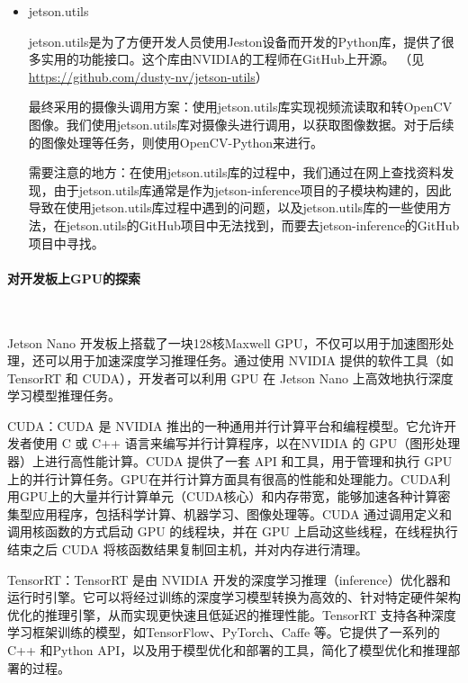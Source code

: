 \documentclass[UTF8]{article}
\begin{document}
\begin{itemize}
    \item jetson.utils
    
    jetson.utils是为了方便开发人员使用Jeston设备而开发的Python库，提供了很多实用的功能接口。这个库由NVIDIA的工程师在GitHub上开源。
    （见\url{https://github.com/dusty-nv/jetson-utils}）

    最终采用的摄像头调用方案：使用jetson.utils库实现视频流读取和转OpenCV图像。我们使用jetson.utils库对摄像头进行调用，以获取图像数据。对于后续的图像处理等任务，则使用OpenCV-Python来进行。

    需要注意的地方：在使用jetson.utils库的过程中，我们通过在网上查找资料发现，由于jetson.utils库通常是作为jetson-inference项目的子模块构建的，因此导致在使用jetson.utils库过程中遇到的问题，以及jetson.utils库的一些使用方法，在jetson.utils的GitHub项目中无法找到，而要去jetson-inference的GitHub项目中寻找。
    
\end{itemize}

\paragraph{对开发板上GPU的探索}~{}

Jetson Nano 开发板上搭载了一块128核Maxwell GPU，不仅可以用于加速图形处理，还可以用于加速深度学习推理任务。通过使用 NVIDIA 提供的软件工具（如 TensorRT 和 CUDA），开发者可以利用 GPU 在 Jetson Nano 上高效地执行深度学习模型推理任务。


CUDA：CUDA 是 NVIDIA 推出的一种通用并行计算平台和编程模型。它允许开发者使用 C 或 C++ 语言来编写并行计算程序，以在NVIDIA 的 GPU（图形处理器）上进行高性能计算。CUDA 提供了一套 API 和工具，用于管理和执行 GPU 上的并行计算任务。GPU在并行计算方面具有很高的性能和处理能力。CUDA利用GPU上的大量并行计算单元（CUDA核心）和内存带宽，能够加速各种计算密集型应用程序，包括科学计算、机器学习、图像处理等。CUDA 通过调用定义和调用核函数的方式启动 GPU 的线程块，并在 GPU 上启动这些线程，在线程执行结束之后 CUDA 将核函数结果复制回主机，并对内存进行清理。

TensorRT：TensorRT 是由 NVIDIA 开发的深度学习推理（inference）优化器和运行时引擎。它可以将经过训练的深度学习模型转换为高效的、针对特定硬件架构优化的推理引擎，从而实现更快速且低延迟的推理性能。TensorRT 支持各种深度学习框架训练的模型，如TensorFlow、PyTorch、Caffe 等。它提供了一系列的 C++ 和Python API，以及用于模型优化和部署的工具，简化了模型优化和推理部署的过程。
\end{document}
